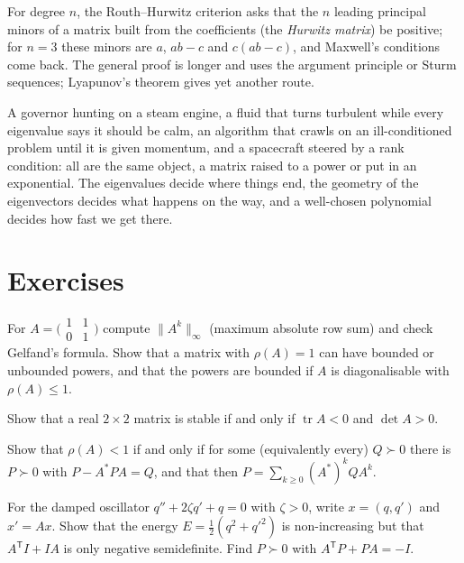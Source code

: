 For degree $n$, the Routh--Hurwitz criterion asks that the $n$ leading principal minors of a matrix built from the coefficients (the
\emph{Hurwitz matrix}) be positive; for $n=3$ these minors are $a$, $ab-c$ and $c(ab-c)$, and Maxwell's conditions come back. The
general proof is longer and uses the argument principle or Sturm sequences; Lyapunov's theorem gives yet another route.

\begin{beauty}
A governor hunting on a steam engine, a fluid that turns turbulent while every eigenvalue says it should be calm, an algorithm that
crawls on an ill-conditioned problem until it is given momentum, and a spacecraft steered by a rank condition: all are the same
object, a matrix raised to a power or put in an exponential. The eigenvalues decide where things end, the geometry of the
eigenvectors decides what happens on the way, and a well-chosen polynomial decides how fast we get there.
\end{beauty}

\section{Exercises}

\begin{exercise}[$\star$]\label{linear:ex:gelfandex}
For $A=\bigl(\begin{smallmatrix}1&1\\0&1\end{smallmatrix}\bigr)$ compute $\|A^k\|_\infty$ (maximum absolute row sum) and check Gelfand's
formula. Show that a matrix with $\rho(A)=1$ can have bounded or unbounded powers, and that the powers are bounded if $A$ is
diagonalisable with $\rho(A)\le1$.
\end{exercise}

\begin{exercise}[$\star$]\label{linear:ex:hurwitz2}
Show that a real $2\times2$ matrix is stable if and only if $\operatorname{tr}A<0$ and $\det A>0$.
\end{exercise}

\begin{exercise}[$\star\star$]\label{linear:ex:stein}
Show that $\rho(A)<1$ if and only if for some (equivalently every) $Q\succ0$ there is $P\succ0$ with $P-A^*PA=Q$, and that then
$P=\sum_{k\ge0}(A^*)^kQA^k$.
\end{exercise}

\begin{exercise}[$\star$]\label{linear:ex:oscillator}
For the damped oscillator $q''+2\zeta q'+q=0$ with $\zeta>0$, write $x=(q,q')$ and $x'=Ax$. Show that the energy $E=\frac12(q^2+q'^2)$ is
non-increasing but that $A^{\mathsf T}I+IA$ is only negative semidefinite. Find $P\succ0$ with $A^{\mathsf T}P+PA=-I$.
\end{exercise}

